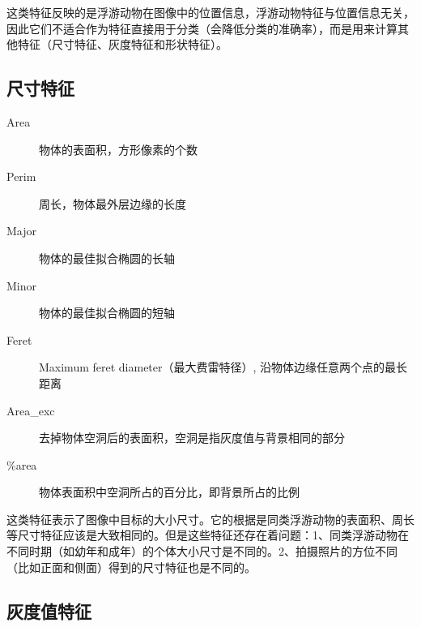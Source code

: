 这类特征反映的是浮游动物在图像中的位置信息，浮游动物特征与位置信息无关，因此它们不适合作为特征直接用于分类（会降低分类的准确率），而是用来计算其他特征（尺寸特征、灰度特征和形状特征）。

\subsection{尺寸特征}

\begin{description}
\item[Area] 物体的表面积，方形像素的个数%
\item[Perim] 周长，物体最外层边缘的长度
\item[Major] 物体的最佳拟合椭圆的长轴%
\item[Minor] 物体的最佳拟合椭圆的短轴%
\item[Feret] Maximum feret diameter（最大费雷特径）, 沿物体边缘任意两个点的最长距离
\item[Area\_exc] 去掉物体空洞后的表面积，空洞是指灰度值与背景相同的部分
\item[\%area] 物体表面积中空洞所占的百分比，即背景所占的比例
\end{description}

这类特征表示了图像中目标的大小尺寸。它的根据是同类浮游动物的表面积、周长等尺寸特征应该是大致相同的。但是这些特征还存在着问题：1、同类浮游动物在不同时期（如幼年和成年）的个体大小尺寸是不同的。2、拍摄照片的方位不同（比如正面和侧面）得到的尺寸特征也是不同的。

\subsection{灰度值特征}

